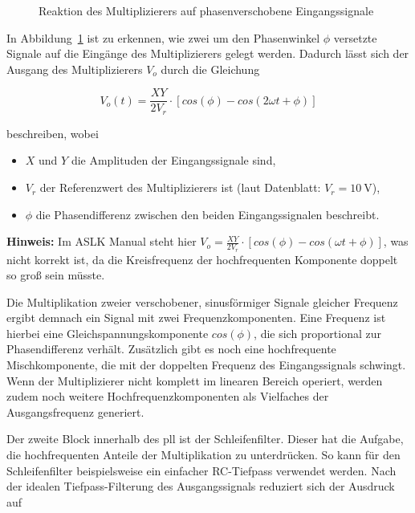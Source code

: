 \documentclass[../main.tex]{subfiles}
\begin{document}
\begin{figure}[H]  
  \centering
  \resizebox{0.6\textwidth}{!}{}
  \caption{Reaktion des Multiplizierers auf phasenverschobene Eingangssignale}
  \label{fig:bsb_multi}
\end{figure}

In Abbildung~\ref{fig:bsb_multi} ist zu erkennen, wie zwei um den Phasenwinkel $\phi$ versetzte Signale auf die Eingänge des Multiplizierers gelegt werden. Dadurch lässt sich der Ausgang des Multiplizierers $V_o$ durch die Gleichung 


\begin{equation*}
V_o(t) = \frac{X Y}{2 V_r} \cdot [cos(\phi)-cos(2\omega t + \phi)]
\end{equation*}

beschreiben, wobei
\begin{itemize}
  \item $X$ und $Y$ die Amplituden der Eingangssignale sind,
  \item $V_r$ der Referenzwert des Multiplizierers ist (laut Datenblatt: $V_r=\SI{10}{\volt}$),
  \item $\phi$ die Phasendifferenz zwischen den beiden Eingangssignalen beschreibt.
\end{itemize}


\textbf{Hinweis:} Im ASLK Manual steht hier $V_o = \frac{X Y}{2 V_r} \cdot [cos(\phi)-cos(\omega t + \phi)]$, was nicht korrekt ist, da die Kreisfrequenz der hochfrequenten Komponente doppelt so groß sein müsste.\par
\medskip

Die  Multiplikation zweier verschobener, sinusförmiger Signale gleicher Frequenz ergibt demnach ein Signal mit zwei Frequenzkomponenten. Eine Frequenz ist hierbei eine Gleichspannungskomponente $cos(\phi)$, die sich proportional zur Phasendifferenz verhält. Zusätzlich gibt es noch eine hochfrequente Mischkomponente, die mit der doppelten Frequenz des Eingangssignals schwingt. Wenn der Multiplizierer nicht komplett im linearen Bereich operiert, werden zudem noch weitere Hochfrequenzkomponenten als Vielfaches der Ausgangsfrequenz generiert. \cite{chengCom} \par
\medskip

Der zweite Block innerhalb des \gls{pll} ist der Schleifenfilter. Dieser hat die Aufgabe, die hochfrequenten Anteile der Multiplikation zu unterdrücken. So kann für den Schleifenfilter beispielsweise ein einfacher RC-Tiefpass verwendet werden. Nach der idealen Tiefpass-Filterung des Ausgangssignals reduziert sich der Ausdruck auf\par
\end{document}
